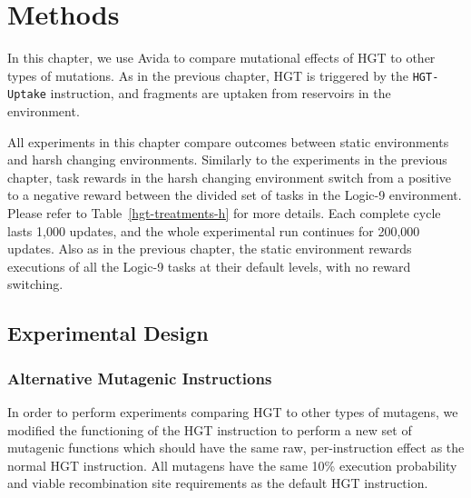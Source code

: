 \documentclass[PhD]{msu-thesis}
\begin{document}
\section{Methods}
In this chapter, we use Avida to compare mutational effects of HGT to other types of mutations. As in the previous chapter, HGT is triggered by the \texttt{HGT-Uptake} instruction, and fragments are uptaken from reservoirs in the environment. 

All experiments in this chapter compare outcomes between static environments and harsh changing environments. Similarly to the experiments in the previous chapter, task rewards in the harsh changing environment switch from a positive to a negative reward between the divided set of tasks in the Logic-9 environment. Please refer to Table~\ref{hgt-treatments-h} for more details. Each complete cycle lasts 1,000 updates, and the whole experimental run continues for 200,000 updates.
Also as in the previous chapter, the static environment rewards executions of all the Logic-9 tasks at their default levels, with no reward switching.

\subsection{Experimental Design}

\subsubsection{Alternative Mutagenic Instructions}
In order to perform experiments comparing HGT to other types of mutagens, we modified the functioning of the HGT instruction to perform a new set of mutagenic functions which should have the same raw, per-instruction effect as the normal HGT instruction. All mutagens have the same 10\% execution probability and viable recombination site requirements as the default HGT instruction.
\end{document}
